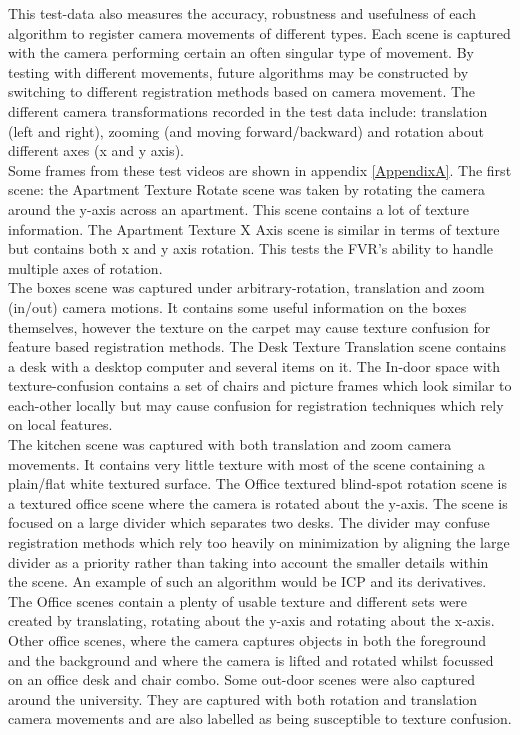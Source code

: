This test-data also measures the accuracy, robustness and usefulness of each algorithm to register camera movements of different types. Each scene is captured with the camera performing certain an often singular type of movement. By testing with different movements, future algorithms may be constructed by switching to different registration methods based on camera movement. The different camera transformations recorded in the test data include: translation (left and right), zooming (and moving forward/backward) and rotation about different axes (x and y axis). \\

Some frames from these test videos are shown in appendix \ref{AppendixA}. The first scene: the Apartment Texture Rotate scene was taken by rotating the camera around the y-axis across an apartment. This scene contains a lot of texture information. The Apartment Texture X Axis scene is similar in terms of texture but contains both x and y axis rotation. This tests the FVR's ability to handle multiple axes of rotation. \\


The boxes scene was captured under arbitrary-rotation, translation and zoom (in/out) camera motions. It contains some useful information on the boxes themselves, however the texture on the carpet may cause texture confusion for feature based registration methods. The Desk Texture Translation scene contains a desk with a desktop computer and several items on it. The In-door space with texture-confusion contains a set of chairs and picture frames which look similar to each-other locally but may cause confusion for registration techniques which rely on local features. \\

The kitchen scene was captured with both translation and zoom camera movements. It contains very little texture with most of the scene containing a plain/flat white textured surface. The Office textured blind-spot rotation scene is a textured office scene where the camera is rotated about the y-axis. The scene is focused on a large divider which separates two desks. The divider may confuse registration methods which rely too heavily on minimization by aligning the large divider as a priority rather than taking into account the smaller details within the scene. An example of such an algorithm would be ICP and its derivatives. \\

The Office scenes contain a plenty of usable texture and different sets were created by translating, rotating about the y-axis and rotating about the x-axis. Other office scenes, where the camera captures objects in both the foreground and the background and where the camera is lifted and rotated whilst focussed on an office desk and chair combo. Some out-door scenes were also captured around the university. They are captured with both rotation and translation camera movements and are also labelled as being susceptible to texture confusion. \\

